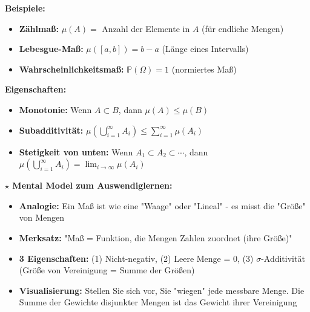\begin{denoobification}[Maß]
\textbf{Beispiele:}
\begin{itemize}
    \item \textbf{Zählmaß:} $\mu(A) =$ Anzahl der Elemente in $A$ (für endliche Mengen)
    \item \textbf{Lebesgue-Maß:} $\mu([a,b]) = b-a$ (Länge eines Intervalls)
    \item \textbf{Wahrscheinlichkeitsmaß:} $\mathbb{P}(\Omega) = 1$ (normiertes Maß)
\end{itemize}

\textbf{Eigenschaften:}
\begin{itemize}
    \item \textbf{Monotonie:} Wenn $A \subset B$, dann $\mu(A) \leq \mu(B)$
    \item \textbf{Subadditivität:} $\mu\left(\bigcup_{i=1}^{\infty} A_i\right) \leq \sum_{i=1}^{\infty} \mu(A_i)$
    \item \textbf{Stetigkeit von unten:} Wenn $A_1 \subset A_2 \subset \cdots$, dann $\mu\left(\bigcup_{i=1}^{\infty} A_i\right) = \lim_{i \to \infty} \mu(A_i)$
\end{itemize}

\textbf{$\star$ Mental Model zum Auswendiglernen:}
\begin{itemize}
    \item \textbf{Analogie:} Ein Maß ist wie eine "Waage" oder "Lineal" - es misst die "Größe" von Mengen
    \item \textbf{Merksatz:} "Maß = Funktion, die Mengen Zahlen zuordnet (ihre Größe)"
    \item \textbf{3 Eigenschaften:} (1) Nicht-negativ, (2) Leere Menge = 0, (3) $\sigma$-Additivität (Größe von Vereinigung = Summe der Größen)
    \item \textbf{Visualisierung:} Stellen Sie sich vor, Sie "wiegen" jede messbare Menge. Die Summe der Gewichte disjunkter Mengen ist das Gewicht ihrer Vereinigung
\end{itemize}

\begin{center}
\end{center}
\end{denoobification}
